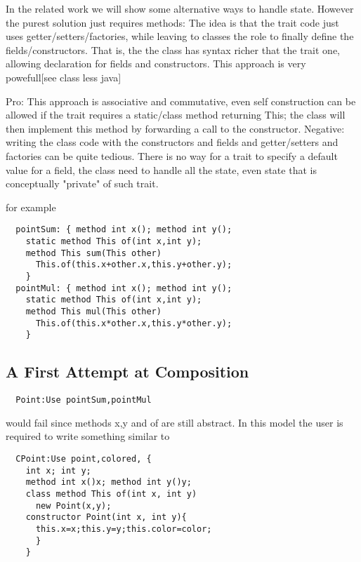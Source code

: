 In the related work we will show some alternative ways to handle state.
However the purest solution just requires methods:
  The idea is that
  the trait code just uses getter/setters/factories, while leaving
  to classes the role to finally define the fields/constructors.
  That is, the  the class has syntax richer that the trait one,
  allowing declaration for fields and constructors.
  This approach is very powefull[see class less java]
 
  Pro: This approach is associative and commutative, even self construction
  can be allowed if the trait requires a static/class method
  returning This; the class will then implement this method by forwarding
  a call to the constructor.
  Negative: writing the class code with the constructors and
   fields and getter/setters and factories can be quite tedious.
   There is no way for a trait to specify a default value for a field,
   the class need to handle all the state, even state that is conceptually
   "private" of such trait.

  for example 

\begin{lstlisting}
  pointSum: { method int x(); method int y();
    static method This of(int x,int y);
    method This sum(This other)
      This.of(this.x+other.x,this.y+other.y);
    }
  pointMul: { method int x(); method int y();
    static method This of(int x,int y);
    method This mul(This other)
      This.of(this.x*other.x,this.y*other.y);
    }
\end{lstlisting}

\subsection{A First Attempt at Composition}

\begin{lstlisting}
  Point:Use pointSum,pointMul
\end{lstlisting}  

\noindent would fail since methods x,y and of are still abstract.
In this model the user is required to write something similar to

\begin{lstlisting}
  CPoint:Use point,colored, {
    int x; int y;
    method int x()x; method int y()y;
    class method This of(int x, int y)
      new Point(x,y);
    constructor Point(int x, int y){
      this.x=x;this.y=y;this.color=color;
      }
    }
\end{lstlisting}

